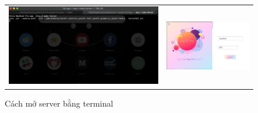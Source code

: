 \documentclass[a4paper]{article}
\begin{document}
\begin{figure}[h!]
	\centering
	\begin{tabular}{c c}
	\includegraphics[width=9cm]{server-terminal} &
	\includegraphics[width=5cm]{server_Launcher}
	
	\end{tabular}
	\caption{Cách mở server bằng terminal}
\end{figure}
\end{document}
